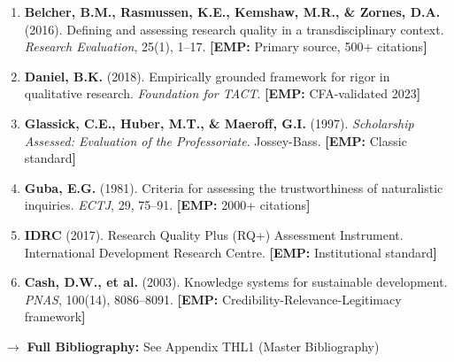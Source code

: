 \documentclass[11pt,a4paper]{article}
\newcommand{\tagEMP}[1]{\textcolor{empgreen}{\textbf{[EMP:} #1\textbf{]}}}
\begin{document}
\begin{enumerate}
    \item \textbf{Belcher, B.M., Rasmussen, K.E., Kemshaw, M.R., \& Zornes, D.A.} (2016). Defining and assessing research quality in a transdisciplinary context. \emph{Research Evaluation}, 25(1), 1--17. \tagEMP{Primary source, 500+ citations}
    
    \item \textbf{Daniel, B.K.} (2018). Empirically grounded framework for rigor in qualitative research. \emph{Foundation for TACT}. \tagEMP{CFA-validated 2023}
    
    \item \textbf{Glassick, C.E., Huber, M.T., \& Maeroff, G.I.} (1997). \emph{Scholarship Assessed: Evaluation of the Professoriate}. Jossey-Bass. \tagEMP{Classic standard}
    
    \item \textbf{Guba, E.G.} (1981). Criteria for assessing the trustworthiness of naturalistic inquiries. \emph{ECTJ}, 29, 75--91. \tagEMP{2000+ citations}
    
    \item \textbf{IDRC} (2017). Research Quality Plus (RQ+) Assessment Instrument. International Development Research Centre. \tagEMP{Institutional standard}
    
    \item \textbf{Cash, D.W., et al.} (2003). Knowledge systems for sustainable development. \emph{PNAS}, 100(14), 8086--8091. \tagEMP{Credibility-Relevance-Legitimacy framework}
\end{enumerate}

$\rightarrow$ \textbf{Full Bibliography:} See Appendix THL1 (Master Bibliography)



\nocite{bcm_master}
\end{document}
